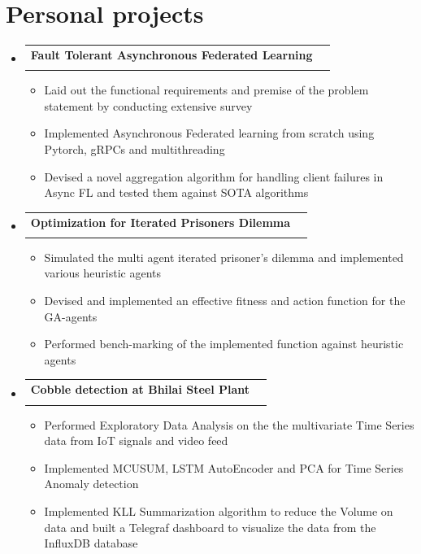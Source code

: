 \documentclass[a4paper,11pt]{article}
\makeatletter
\newcommand{\resumeSubheading}[4]{
\vspace{0.5mm}\item
    \begin{tabular*}{0.98\textwidth}[t]{l@{\extracolsep{\fill}}r}
        \textbf{#1} & \textit{\footnotesize{#4}} \\
        \textit{\footnotesize{#3}} &  \footnotesize{#2}\\
    \end{tabular*}
    \vspace{-2.4mm}
}
\newcommand{\resumeSubHeadingListStart}{\begin{itemize}[leftmargin=*,labelsep=0mm]}
\newcommand{\resumeItemListStart}{\begin{justify}\begin{itemize}[leftmargin=3ex, rightmargin=2ex, noitemsep,labelsep=1.2mm,itemsep=0mm]\small}
\newcommand{\resumeSubHeadingListEnd}{\end{itemize}\vspace{2mm}}
\newcommand{\resumeItemListEnd}{\end{itemize}\end{justify}\vspace{-2mm}}
\makeatother
\begin{document}
\section{Personal projects}
\resumeSubHeadingListStart
\resumeSubheading
{Fault Tolerant Asynchronous Federated Learning}{}
{\phantom{under Dr. Subhajit Sidhanta}}{\phantom{February, 2023 - April, 2023}}
\vspace{-1.5 em}
\resumeItemListStart
\item {Laid out the functional requirements and premise of the problem statement by conducting extensive survey}
\item {Implemented Asynchronous Federated learning from scratch using Pytorch, gRPCs and multithreading}
\item {Devised a novel aggregation algorithm for handling client failures in Async FL and tested them against SOTA algorithms} 
\resumeItemListEnd
\resumeSubHeadingListEnd
\vspace{-5.5mm}


\resumeSubHeadingListStart
\resumeSubheading
{Optimization for Iterated Prisoners Dilemma}{}
{\phantom{under Dr. Subhajit Sidhanta}}{\phantom{February, 2023 - April, 2023}}
\vspace{-1.5 em}
\resumeItemListStart
\item {Simulated the multi agent iterated prisoner's dilemma and implemented various heuristic agents }
\item {Devised and implemented an effective fitness and action function for the GA-agents}
\item {Performed bench-marking of the implemented function against heuristic agents}
\resumeItemListEnd
\resumeSubHeadingListEnd
\vspace{-5.5mm}

\resumeSubHeadingListStart
\resumeSubheading
{Cobble detection at Bhilai Steel Plant}{}
{\phantom{under Dr. Subhajit Sidhanta}}{\phantom{February, 2023 - April, 2023}}
\vspace{-1.5 em}
\resumeItemListStart
\item {Performed Exploratory Data Analysis on the the multivariate Time Series data from IoT signals and video feed}
\item {Implemented MCUSUM, LSTM AutoEncoder and PCA for Time Series Anomaly detection}
\item {Implemented KLL Summarization algorithm to reduce the Volume on data and built a Telegraf dashboard to visualize the data from the InfluxDB database }
\resumeItemListEnd
\resumeSubHeadingListEnd
\vspace{-5.5mm}
\end{document}
